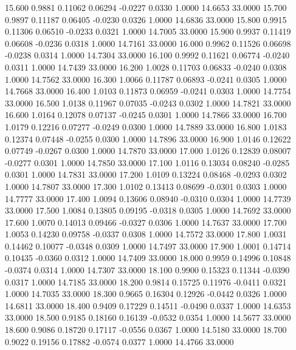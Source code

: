   15.600   0.9881   0.11062   0.06294  -0.0227   0.0330   1.0000  14.6653  33.0000
  15.700   0.9897   0.11187   0.06405  -0.0230   0.0326   1.0000  14.6836  33.0000
  15.800   0.9915   0.11306   0.06510  -0.0233   0.0321   1.0000  14.7005  33.0000
  15.900   0.9937   0.11419   0.06608  -0.0236   0.0318   1.0000  14.7161  33.0000
  16.000   0.9962   0.11526   0.06698  -0.0238   0.0314   1.0000  14.7304  33.0000
  16.100   0.9992   0.11621   0.06774  -0.0240   0.0311   1.0000  14.7439  33.0000
  16.200   1.0028   0.11703   0.06833  -0.0240   0.0308   1.0000  14.7562  33.0000
  16.300   1.0066   0.11787   0.06893  -0.0241   0.0305   1.0000  14.7668  33.0000
  16.400   1.0103   0.11873   0.06959  -0.0241   0.0303   1.0000  14.7754  33.0000
  16.500   1.0138   0.11967   0.07035  -0.0243   0.0302   1.0000  14.7821  33.0000
  16.600   1.0164   0.12078   0.07137  -0.0245   0.0301   1.0000  14.7866  33.0000
  16.700   1.0179   0.12216   0.07277  -0.0249   0.0300   1.0000  14.7889  33.0000
  16.800   1.0183   0.12374   0.07448  -0.0255   0.0300   1.0000  14.7896  33.0000
  16.900   1.0146   0.12622   0.07749  -0.0267   0.0300   1.0000  14.7870  33.0000
  17.000   1.0126   0.12839   0.08007  -0.0277   0.0301   1.0000  14.7850  33.0000
  17.100   1.0116   0.13034   0.08240  -0.0285   0.0301   1.0000  14.7831  33.0000
  17.200   1.0109   0.13224   0.08468  -0.0293   0.0302   1.0000  14.7807  33.0000
  17.300   1.0102   0.13413   0.08699  -0.0301   0.0303   1.0000  14.7777  33.0000
  17.400   1.0094   0.13606   0.08940  -0.0310   0.0304   1.0000  14.7739  33.0000
  17.500   1.0084   0.13805   0.09195  -0.0318   0.0305   1.0000  14.7692  33.0000
  17.600   1.0070   0.14013   0.09466  -0.0327   0.0306   1.0000  14.7637  33.0000
  17.700   1.0053   0.14230   0.09758  -0.0337   0.0308   1.0000  14.7572  33.0000
  17.800   1.0031   0.14462   0.10077  -0.0348   0.0309   1.0000  14.7497  33.0000
  17.900   1.0001   0.14714   0.10435  -0.0360   0.0312   1.0000  14.7409  33.0000
  18.000   0.9959   0.14996   0.10848  -0.0374   0.0314   1.0000  14.7307  33.0000
  18.100   0.9900   0.15323   0.11344  -0.0390   0.0317   1.0000  14.7185  33.0000
  18.200   0.9814   0.15725   0.11976  -0.0411   0.0321   1.0000  14.7035  33.0000
  18.300   0.9665   0.16304   0.12926  -0.0442   0.0326   1.0000  14.6811  33.0000
  18.400   0.9409   0.17229   0.14511  -0.0490   0.0337   1.0000  14.6353  33.0000
  18.500   0.9185   0.18160   0.16139  -0.0532   0.0354   1.0000  14.5677  33.0000
  18.600   0.9086   0.18720   0.17117  -0.0556   0.0367   1.0000  14.5180  33.0000
  18.700   0.9022   0.19156   0.17882  -0.0574   0.0377   1.0000  14.4766  33.0000
